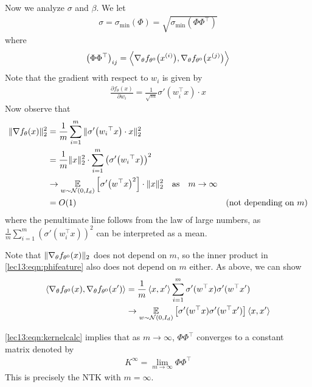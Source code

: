 \begin{enumerate}
    Now we analyze $\sigma$ and $\beta$. We let
    \begin{align}
        \sigma = \sigma_{\min} (\Phi) = \sqrt{\sigma_{\min} \left( \Phi \Phi^\top \right)}
    \end{align}
    where 
    \begin{align}
        \left( \Phi \Phi^\top \right)_{ij} = \left\langle\nabla_\theta f_{\theta^0} \big(x^{(i)} \big) , \nabla_\theta f_{\theta^0} \big(x^{(j)} \big)\right\rangle \label{lec13:eqn:phifeature} 
    \end{align} 
    Note that the gradient with respect to $w_i$ is given by 
    \begin{align}  
        \frac{\partial f_\theta(x) }{\partial w_i} = \frac{1}{\sqrt{m}} \sigma'(w_i^\top x ) \cdot x 
    \end{align} 
    Now observe that
    \begin{align}
        \|\nabla f_\theta(x)\|_2^2 & = \frac{1}{m}\sum_{i=1}^m \|\sigma'\big({w_i}^\top x \big) \cdot x \|_2^2 \\ 
        & = \frac{1}{m}\|x\|_2^2 \cdot \sum_{i=1}^m \left( \sigma' \big({w_i}^\top x \big) \right)^2 \\ 
        &\to \operatorname*{\mathbb{E}}_{w \sim \mathcal N(0,I_d)} \left[ \sigma' \big( w^\top x \big)^2 \right] \cdot \|x\|_2^2 \quad \text{as} \quad m\to\infty \\ 
        &= O(1) &\text{(not depending on $m$)}
    \end{align} 
    where the penultimate line follows from the law of large numbers, as $\frac{1}{m} \sum_{i=1}^m \left( \sigma'(w_i^\top x ) \right)^2$ can be interpreted as a mean. 
    
    Note that $\|\nabla_\theta f_{\theta^0} (x)\|_2$ does not depend on $m$, so the inner product in \eqref{lec13:eqn:phifeature} also does not depend on $m$ either. As above, we can show 
    \begin{align} 
        \left\langle\nabla_\theta f_{\theta^0} (x), \nabla_\theta f_{\theta^0} (x')\right\rangle & = \frac{1}{m}\left\langle x,x'\right\rangle \sum_{i=1}^m \sigma'(w^\top x) \sigma'(w^\top x')  \\ 
        & \to \operatorname*{\mathbb{E}}_{w \sim \mathcal N(0,I_d)} \left[ \sigma'(w^\top x) \sigma'(w^\top x') \right] \left\langle x, x'\right\rangle \label{lec13:eqn:kernelcalc} 
    \end{align}
    
    \eqref{lec13:eqn:kernelcalc} implies that as $m \to \infty$, $\Phi \Phi^\top$ converges to a constant matrix denoted by 
    \begin{align}
        K^\infty = \lim_{m \to \infty} \Phi\Phi^\top 
    \end{align}
    This is precisely the NTK with $m=\infty$. 
    

\end{enumerate}
